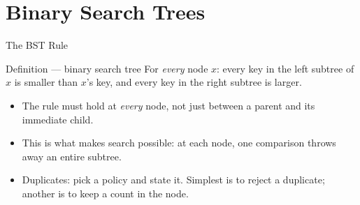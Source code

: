 \documentclass[aspectratio=169]{beamer}
\begin{document}

\section{Binary Search Trees}


\begin{frame}{The BST Rule}
  \begin{block}{Definition --- binary search tree}
    For \emph{every} node $x$: every key in the left subtree of $x$ is
    smaller than $x$'s key, and every key in the right subtree is larger.
  \end{block}
  \begin{itemize}
    \item The rule must hold at \emph{every} node, not just between a parent
      and its immediate child.
    \item This is what makes search possible: at each node, one comparison
      throws away an entire subtree.
    \item Duplicates: pick a policy and state it. Simplest is to reject a
      duplicate; another is to keep a count in the node.
  \end{itemize}
\end{frame}
\end{document}
